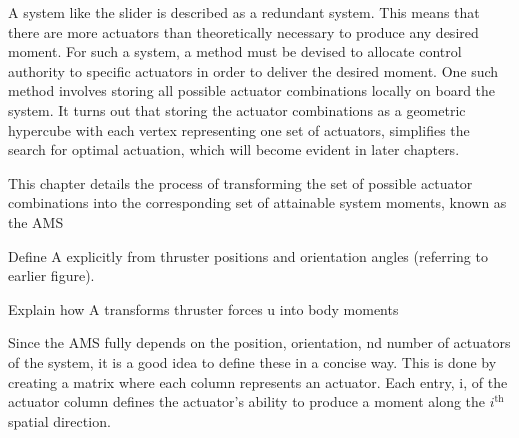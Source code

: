 A system like the slider is described as a redundant system. This means that there are more actuators than theoretically necessary to produce any desired moment. For such a system, a method must be devised to allocate control authority to specific actuators in order to deliver the desired moment. One such method involves storing all possible actuator combinations locally on board the system. It turns out that storing the actuator combinations as a geometric hypercube with each vertex representing one set of actuators, simplifies the search for optimal actuation,  which will become evident in later chapters. 

This chapter details the process of transforming the set of possible actuator combinations into the corresponding set of attainable system moments, known as the \gls{AMS}




Define A explicitly from thruster positions and orientation angles (referring to earlier figure).

Explain how A transforms thruster forces  u into body moments 

Since the \gls{AMS} fully depends on the position, orientation, nd number of actuators of the system, it is a good idea to define these in a concise way. This is done by creating a matrix where each column represents an actuator. Each entry, i, of the actuator column defines the actuator's ability to produce a moment along the $i^{\text{th}}$ spatial direction. 





